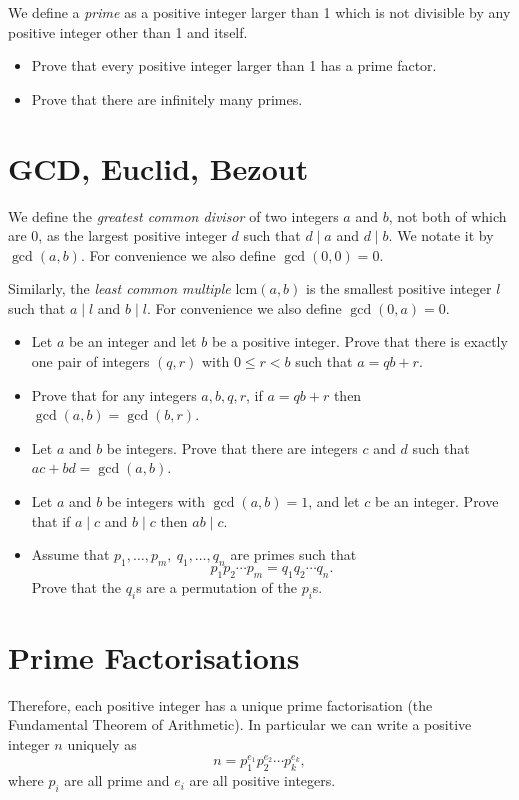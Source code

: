 \documentclass{article}
\begin{document}
  We define a \emph{prime} as a positive integer larger than 1 which is not
  divisible by any positive integer other than 1 and itself.
  \begin{itemize}
    \item Prove that every positive integer larger than 1 has a prime factor.
    \item Prove that there are infinitely many primes.
  \end{itemize}
\section{GCD, Euclid, Bezout}
  We define the \emph{greatest common divisor} of two integers $a$ and $b$, not
  both of which are 0, as the largest positive integer $d$ such that $d\mid a$
  and $d\mid b$. We notate it by $\gcd(a,b)$. For convenience we also define
  $\gcd(0,0)=0$.

  Similarly, the \emph{least common multiple} $\mathrm{lcm}(a,b)$ is the
  smallest positive integer $l$ such that $a\mid l$ and $b\mid l$. For
  convenience we also define $\gcd(0,a)=0$.
  \begin{itemize}
    \item Let $a$ be an integer and let $b$ be a positive integer. Prove that
      there is exactly one pair of integers $(q,r)$ with $0\le r<b$ such that
      $a=qb+r$.
    \item Prove that for any integers $a,b,q,r$, if $a=qb+r$ then
      $\gcd(a,b)=\gcd(b,r)$.
    \item Let $a$ and $b$ be integers. Prove that there are integers $c$ and $d$
      such that $ac+bd=\gcd(a,b)$.
    \item Let $a$ and $b$ be integers with $\gcd(a,b)=1$, and let $c$ be an
      integer. Prove that if $a\mid c$ and $b\mid c$ then $ab\mid c$.
    \item Assume that $p_1,\ldots,p_m,\ q_1,\ldots,q_n$ are primes such that
      \[p_1p_2\cdots p_m=q_1q_2\cdots q_n.\]
      Prove that the $q_i$s are a permutation of the $p_i$s.
  \end{itemize}
\section{Prime Factorisations}
  Therefore, each positive integer has a unique prime factorisation (the
  Fundamental Theorem of Arithmetic).
  In particular we can write a positive integer $n$ uniquely as
  \[n=p_1^{e_1}p_2^{e_2}\cdots p_k^{e_k},\]
  where $p_i$ are all prime and $e_i$ are all positive integers.
\end{document}
